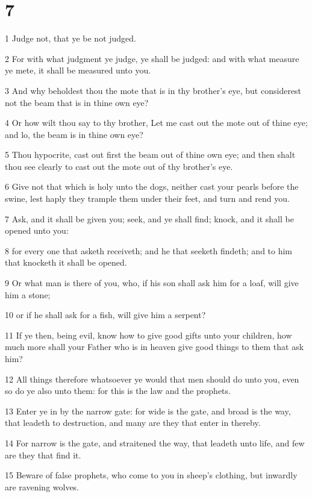 \chapter{7}

\par 1 Judge not, that ye be not judged.
\par 2 For with what judgment ye judge, ye shall be judged: and with what measure ye mete, it shall be measured unto you.
\par 3 And why beholdest thou the mote that is in thy brother's eye, but considerest not the beam that is in thine own eye?
\par 4 Or how wilt thou say to thy brother, Let me cast out the mote out of thine eye; and lo, the beam is in thine own eye?
\par 5 Thou hypocrite, cast out first the beam out of thine own eye; and then shalt thou see clearly to cast out the mote out of thy brother's eye.
\par 6 Give not that which is holy unto the dogs, neither cast your pearls before the swine, lest haply they trample them under their feet, and turn and rend you.
\par 7 Ask, and it shall be given you; seek, and ye shall find; knock, and it shall be opened unto you:
\par 8 for every one that asketh receiveth; and he that seeketh findeth; and to him that knocketh it shall be opened.
\par 9 Or what man is there of you, who, if his son shall ask him for a loaf, will give him a stone;
\par 10 or if he shall ask for a fish, will give him a serpent?
\par 11 If ye then, being evil, know how to give good gifts unto your children, how much more shall your Father who is in heaven give good things to them that ask him?
\par 12 All things therefore whatsoever ye would that men should do unto you, even so do ye also unto them: for this is the law and the prophets.
\par 13 Enter ye in by the narrow gate: for wide is the gate, and broad is the way, that leadeth to destruction, and many are they that enter in thereby.
\par 14 For narrow is the gate, and straitened the way, that leadeth unto life, and few are they that find it.
\par 15 Beware of false prophets, who come to you in sheep's clothing, but inwardly are ravening wolves.
